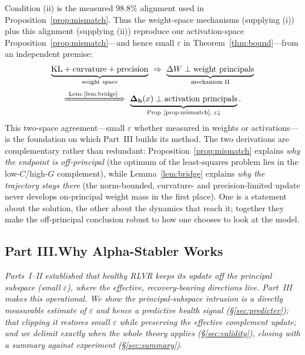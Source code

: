 \documentclass[11pt]{article}
\newcommand{\bh}{\mathbf{h}}
\newcommand{\bDelta}{\bm{\Delta}}
\newcommand{\Dh}{\bDelta_{\bh}}      %
\begin{document}
\noindent
Condition (ii) is the measured $98.8\%$ alignment used in Proposition~\ref{prop:mismatch}. Thus the
weight-space mechanisms (supplying (i)) plus this alignment (supplying (ii)) reproduce our
activation-space Proposition~\ref{prop:mismatch}---and hence small $\varepsilon$ in
Theorem~\ref{thm:bound}---from an independent premise:
\begin{equation*}
\begin{gathered}
\underbrace{\text{KL}+\text{curvature}+\text{precision}}_{\text{weight space}}
\ \Rightarrow\
\underbrace{\Delta W\perp\text{weight principals}}_{\text{mechanism II}}\\[2pt]
\xRightarrow{\ \text{Lem.\,\ref{lem:bridge}}\ }\
\underbrace{\Dh(x)\perp\text{activation principals}}_{\text{Prop.\,\ref{prop:mismatch},\ }\varepsilon\downarrow}.
\end{gathered}
\end{equation*}
This two-space agreement---small $\varepsilon$ whether measured in weights or activations---is the
foundation on which Part~III builds its method. The two derivations are complementary rather than
redundant: Proposition~\ref{prop:mismatch} explains \emph{why the endpoint is off-principal} (the
optimum of the least-squares problem lies in the low-$C$/high-$G$ complement), while
Lemma~\ref{lem:bridge} explains \emph{why the trajectory stays there} (the norm-bounded, curvature-
and precision-limited update never develops on-principal weight mass in the first place). One is a
statement about the solution, the other about the dynamics that reach it; together they make the
off-principal conclusion robust to how one chooses to look at the model.

\subsection*{Part III.\quad Why Alpha-Stabler Works}
\noindent\emph{Parts~I--II established that healthy RLVR keeps its
update off the principal subspace (small $\varepsilon$), where the effective, recovery-bearing
directions live. Part~III makes this operational. We show the principal-subspace
intrusion is a directly measurable estimate of $\varepsilon$ and hence a predictive health signal
(\S\ref{sec:predicter}); that clipping it restores small $\varepsilon$ while preserving the
effective complement update; and we delimit exactly when the whole theory applies
(\S\ref{sec:validity}), closing with a summary against experiment (\S\ref{sec:summary}).}
\end{document}
